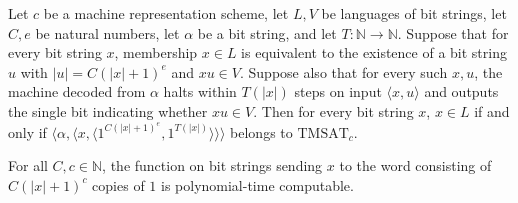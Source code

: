 \begin{lemma}
\label{Complexity.tmsat_reduction_correct}
\leanok
{}
Let $c$ be a machine representation scheme, let $L,V$ be languages of bit strings, let
$C,e$ be natural numbers, let $\alpha$ be a bit string, and let $T :
\mathbb{N}\to\mathbb{N}$. Suppose that for every bit string $x$, membership $x\in L$ is
equivalent to the existence of a bit string $u$ with $|u|=C(|x|+1)^e$ and $x u\in V$.
Suppose also that for every such $x,u$, the machine decoded from $\alpha$ halts within
$T(|x|)$ steps on input $\langle x,u\rangle$ and outputs the single bit indicating
whether $x u\in V$. Then for every bit string $x$, $x\in L$ if and only if
$\langle\alpha,\langle x,\langle1^{C(|x|+1)^e},1^{T(|x|)}\rangle\rangle\rangle$ belongs
to $\mathrm{TMSAT}_c$.
\end{lemma}

\begin{lemma}
\label{Complexity.tmsat_certificate_unary}
\leanok
{}
For all $C,c\in\mathbb{N}$, the function on bit strings sending $x$ to the word
consisting of $C(|x|+1)^c$ copies of $1$ is polynomial-time computable.
\end{lemma}

